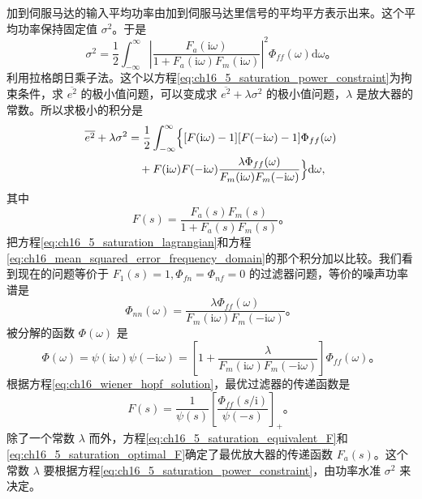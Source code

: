 加到伺服马达的输入平均功率由加到伺服马达里信号的平均平方表示出来。这个平均功率保持固定值 $\sigma^2$。于是
\begin{equation}
\sigma^2 = \frac{1}{2}\int_{-\infty}^{\infty} \left|\frac{F_a(\mathrm{i}\omega)}{1+F_a(\mathrm{i}\omega)F_m(\mathrm{i}\omega)}\right|^2 \Phi_{ff}(\omega)\mathrm{d}\omega。
\label{eq:ch16_5_saturation_power_constraint}
\end{equation}
利用拉格朗日乘子法。这个以方程\eqref{eq:ch16_5_saturation_power_constraint}为拘束条件，求 $\overline{e^2}$ 的极小值问题，可以变成求 $\overline{e^2}+\lambda\sigma^2$ 的极小值问题，$\lambda$ 是放大器的常数。所以求极小的积分是
\begin{equation}
\begin{aligned}
\overline{e^2}+\lambda\sigma^2 &= \frac{1}{2}\int_{-\infty}^{\infty} \Bigl\{[F(\mathrm{i}\omega)-1][F(-\mathrm{i}\omega)-1]\Phi_{ff}(\omega) \\
&\quad + F(\mathrm{i}\omega)F(-\mathrm{i}\omega)\frac{\lambda\Phi_{ff}(\omega)}{F_m(\mathrm{i}\omega)F_m(-\mathrm{i}\omega)}\Bigr\}\mathrm{d}\omega,
\end{aligned}
\label{eq:ch16_5_saturation_lagrangian}
\end{equation}
其中
\begin{equation}
F(s) = \frac{F_a(s)F_m(s)}{1+F_a(s)F_m(s)}。
\label{eq:ch16_5_saturation_equivalent_F}
\end{equation}
把方程\eqref{eq:ch16_5_saturation_lagrangian}和方程\eqref{eq:ch16_mean_squared_error_frequency_domain}的那个积分加以比较。我们看到现在的问题等价于 $F_1(s)=1,\Phi_{fn}=\Phi_{nf}=0$ 的过滤器问题，等价的噪声功率谱是
\begin{equation*}
\Phi_{nn}(\omega) = \frac{\lambda\Phi_{ff}(\omega)}{F_m(\mathrm{i}\omega)F_m(-\mathrm{i}\omega)}。
\end{equation*}
被分解的函数 $\Phi(\omega)$ 是
\begin{equation}
\Phi(\omega) = \psi(\mathrm{i}\omega)\psi(-\mathrm{i}\omega) = \left[1+\frac{\lambda}{F_m(\mathrm{i}\omega)F_m(-\mathrm{i}\omega)}\right]\Phi_{ff}(\omega)。
\label{eq:ch16_5_saturation_total_psd}
\end{equation}
根据方程\eqref{eq:ch16_wiener_hopf_solution}，最优过滤器的传递函数是
\begin{equation}
F(s) = \frac{1}{\psi(s)}\left[\frac{\Phi_{ff}(s/\mathrm{i})}{\psi(-s)}\right]_+。
\label{eq:ch16_5_saturation_optimal_F}
\end{equation}
除了一个常数 $\lambda$ 而外，方程\eqref{eq:ch16_5_saturation_equivalent_F}和\eqref{eq:ch16_5_saturation_optimal_F}确定了最优放大器的传递函数 $F_a(s)$。这个常数 $\lambda$ 要根据方程\eqref{eq:ch16_5_saturation_power_constraint}，由功率水准 $\sigma^2$ 来决定。

